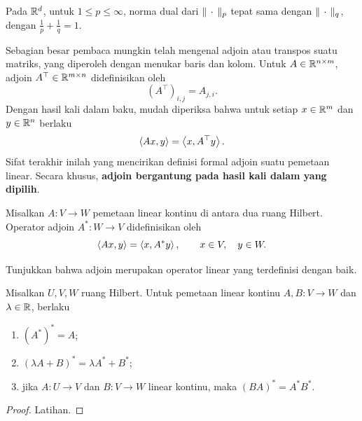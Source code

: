 \begin{example}[Dual]
    Pada $\mathbb{R}^d$, untuk $1\leq p\leq\infty$, norma dual dari
    $\|\,\cdot\,\|_p$ tepat sama dengan $\|\,\cdot\,\|_q$, dengan
    $\frac1p+\frac1q=1$.
\end{example}

Sebagian besar pembaca mungkin telah mengenal adjoin atau transpos suatu
matriks, yang diperoleh dengan menukar baris dan kolom. Untuk
$A\in\mathbb{R}^{n\times m}$, adjoin $A^\top\in\mathbb{R}^{m\times n}$ didefinisikan oleh
\begin{equation}
    (A^\top)_{i,j}=A_{j,i}.
\end{equation}
Dengan hasil kali dalam baku, mudah diperiksa bahwa untuk setiap
$x\in\mathbb{R}^m$ dan $y\in\mathbb{R}^n$ berlaku
\begin{equation}
    \left\langle Ax , y\right\rangle=\left\langle x , A^\top y\right\rangle.
\end{equation}
Sifat terakhir inilah yang mencirikan definisi formal adjoin suatu pemetaan
linear. Secara khusus, \textbf{adjoin bergantung pada hasil kali dalam yang
dipilih}.

\begin{defn}
    Misalkan $A:V\rightarrow W$ pemetaan linear kontinu di antara dua ruang
    Hilbert. Operator adjoin $A^*:W\rightarrow V$ didefinisikan oleh
    \begin{equation}
        \left\langle Ax , y\right\rangle=\left\langle x , A^*y\right\rangle,
        \qquad x\in V,\quad y\in W.
    \end{equation}
\end{defn}

\begin{exercise}
    Tunjukkan bahwa adjoin merupakan operator linear yang terdefinisi dengan
    baik.
\end{exercise}

\begin{lemma}
    Misalkan $U,V,W$ ruang Hilbert. Untuk pemetaan linear kontinu
    $A,B:V\rightarrow W$ dan $\lambda\in\mathbb{R}$, berlaku
    \begin{enumerate}
        \item $(A^*)^*=A$;
        \item $(\lambda A+B)^*=\lambda A^*+B^*$;
        \item jika $A:U\rightarrow V$ dan $B:V\rightarrow W$ linear kontinu,
        maka $(BA)^*=A^*B^*$.
    \end{enumerate}
\end{lemma}

\begin{proof}
    Latihan.
\end{proof}

